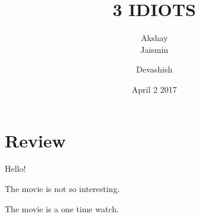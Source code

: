 \documentclass{article}
\title{3 IDIOTS}
\author{Akshay\\Jaismin}
\author{Devashish}
\date{April 2 2017}
\begin{document}
\maketitle
\section{Review}

Hello!

The movie is not so interesting.

The movie is a one time watch.
\end{document}
